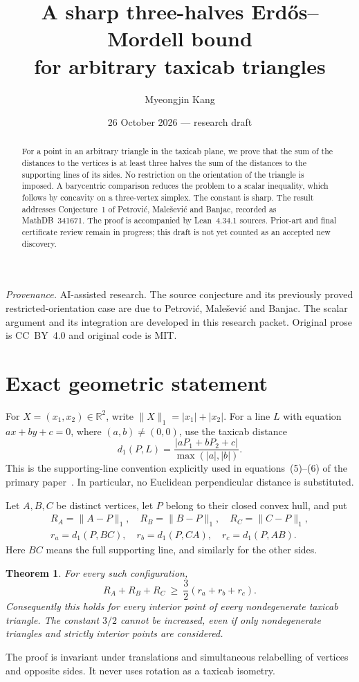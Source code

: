 \documentclass[11pt]{article}
\title{A sharp three-halves Erd\H{o}s--Mordell bound\\for arbitrary taxicab triangles}
\author{Myeongjin Kang}
\date{26 October 2026 --- research draft}
\newtheorem{theorem}{Theorem}
\newcommand{\R}{\mathbb R}
\newcommand{\abs}[1]{\lvert#1\rvert}
\newcommand{\norm}[1]{\lVert#1\rVert_1}
\begin{document}
\maketitle
\begin{abstract}
For a point in an arbitrary triangle in the taxicab plane, we prove that the sum of the distances to the vertices is at least three halves the sum of the distances to the supporting lines of its sides. No restriction on the orientation of the triangle is imposed. A barycentric comparison reduces the problem to a scalar inequality, which follows by concavity on a three-vertex simplex. The constant is sharp. The result addresses Conjecture~1 of Petrovi\'c, Male\v{s}evi\'c and Banjac, recorded as MathDB~341671. The proof is accompanied by Lean~4.34.1 sources. Prior-art and final certificate review remain in progress; this draft is not yet counted as an accepted new discovery.
\end{abstract}
\noindent\textit{Provenance.} AI-assisted research. The source conjecture and its previously proved restricted-orientation case are due to Petrovi\'c, Male\v{s}evi\'c and Banjac. The scalar argument and its integration are developed in this research packet. Original prose is CC~BY~4.0 and original code is MIT.

\section{Exact geometric statement}
For $X=(x_1,x_2)\in\R^2$, write $\norm X=\abs{x_1}+\abs{x_2}$. For a line $L$ with equation $a x+b y+c=0$, where $(a,b)\ne(0,0)$, use the taxicab distance
\begin{equation}\label{eq:line}
 d_1(P,L)=\frac{\abs{aP_1+bP_2+c}}{\max(\abs a,\abs b)}.
\end{equation}
This is the supporting-line convention explicitly used in equations~(5)--(6) of the primary paper~\cite{pmb}. In particular, no Euclidean perpendicular distance is substituted.

Let $A,B,C$ be distinct vertices, let $P$ belong to their closed convex hull, and put
\[
 \begin{gathered}
 R_A=\norm{A-P},\quad R_B=\norm{B-P},\quad R_C=\norm{C-P},\\
 r_a=d_1(P,BC),\quad r_b=d_1(P,CA),\quad r_c=d_1(P,AB).
 \end{gathered}
\]
Here $BC$ means the full supporting line, and similarly for the other sides.
\begin{theorem}\label{thm:main}
For every such configuration,
\begin{equation}\label{eq:main}
 R_A+R_B+R_C\ \ge\ \frac32(r_a+r_b+r_c).
\end{equation}
Consequently this holds for every interior point of every nondegenerate taxicab triangle. The constant $3/2$ cannot be increased, even if only nondegenerate triangles and strictly interior points are considered.
\end{theorem}
The proof is invariant under translations and simultaneous relabelling of vertices and opposite sides. It never uses rotation as a taxicab isometry.
\end{document}
